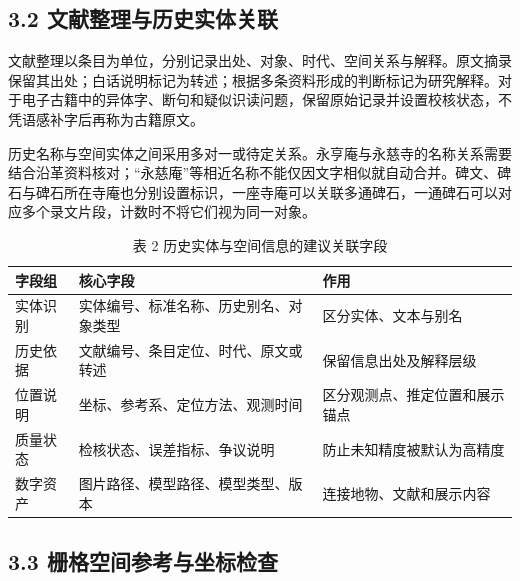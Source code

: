 \documentclass[UTF8,a4paper,zihao=-4]{ctexart}
\begin{document}
\subsection*{3.2 文献整理与历史实体关联}

文献整理以条目为单位，分别记录出处、对象、时代、空间关系与解释。原文摘录保留其出处；白话说明标记为转述；根据多条资料形成的判断标记为研究解释。对于电子古籍中的异体字、断句和疑似识读问题，保留原始记录并设置校核状态，不凭语感补字后再称为古籍原文。


历史名称与空间实体之间采用多对一或待定关系。永亨庵与永慈寺的名称关系需要结合沿革资料核对；“永慈庵”等相近名称不能仅因文字相似就自动合并。碑文、碑石与碑石所在寺庵也分别设置标识，一座寺庵可以关联多通碑石，一通碑石可以对应多个录文片段，计数时不将它们视为同一对象。


\begin{table}[H]\centering\caption*{表 2 历史实体与空间信息的建议关联字段}\small

\begin{tabularx}{\textwidth}{>{\raggedright\arraybackslash}X>{\raggedright\arraybackslash}X>{\raggedright\arraybackslash}X}\toprule

字段组 & 核心字段 & 作用 \\

\midrule

实体识别 & 实体编号、标准名称、历史别名、对象类型 & 区分实体、文本与别名 \\

历史依据 & 文献编号、条目定位、时代、原文或转述 & 保留信息出处及解释层级 \\

位置说明 & 坐标、参考系、定位方法、观测时间 & 区分观测点、推定位置和展示锚点 \\

质量状态 & 检核状态、误差指标、争议说明 & 防止未知精度被默认为高精度 \\

数字资产 & 图片路径、模型路径、模型类型、版本 & 连接地物、文献和展示内容 \\

\bottomrule\end{tabularx}\end{table}

\subsection*{3.3 栅格空间参考与坐标检查}
\end{document}
